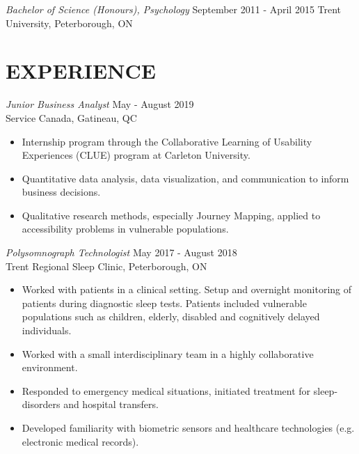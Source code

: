 \documentclass[10pt]{res} %
\begin{document}
\begin{resume}
{\sl Bachelor of Science (Honours), Psychology} \hfill September 2011 - April 2015\newline
Trent University, Peterborough, ON



\section{EXPERIENCE}

{\sl Junior Business Analyst} \hfill May - August 2019 \\
Service Canada, Gatineau, QC
\begin{itemize}\itemsep -2pt %
    \item Internship program through the Collaborative Learning of Usability Experiences (CLUE) program at Carleton University.
    \item Quantitative data analysis, data visualization, and communication to inform business decisions.
    \item Qualitative research methods, especially Journey Mapping, applied to accessibility problems in vulnerable populations.
\end{itemize} 


{\sl Polysomnograph Technologist} \hfill May 2017 - August 2018 \\
Trent Regional Sleep Clinic, Peterborough, ON
\begin{itemize}\itemsep -2pt %
    \item Worked with patients in a clinical setting. Setup and overnight monitoring of patients during diagnostic sleep tests. Patients included vulnerable populations such as children, elderly, disabled and cognitively delayed individuals.
    \item Worked with a small interdisciplinary team in a highly collaborative environment.
    \item Responded to emergency medical situations, initiated treatment for sleep-disorders and hospital transfers.
    \item Developed familiarity with biometric sensors and healthcare technologies (e.g. electronic medical records).
\end{itemize} 


\end{resume}
\end{document}
